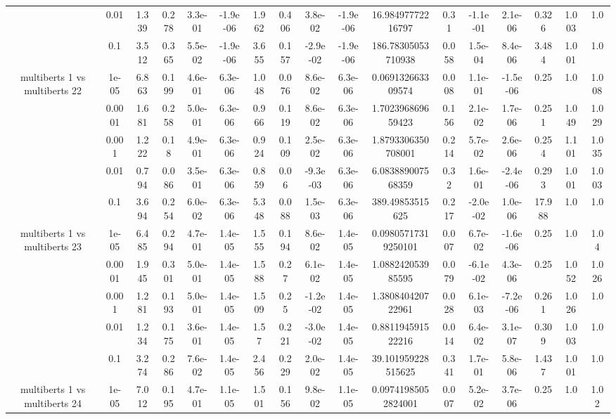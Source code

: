 \begin{tabular}{|c|c|c|c|c|c|c|c|c|c|c|c|c|c|c|c|c|}
 & 0.01 & 1.339 & 0.278 & 3.3e-01 & -1.9e-06 & 1.962 & 0.406 & 3.8e-02 & -1.9e-06 & 16.98497772216797 & 0.31 & -1.1e-01 & 2.1e-06 & 0.326 & 1.003 & 1.0 \\
 & 0.1 & 3.512 & 0.365 & 5.5e-02 & -1.9e-06 & 3.655 & 0.157 & -2.9e-02 & -1.9e-06 & 186.78305053710938 & 0.058 & 1.5e-04 & 8.4e-06 & 3.484 & 1.001 & 1.0 \\
\hline
\multirow{5}{*}{multiberts 1 vs multiberts 22} & 1e-05 & 6.863 & 0.199 & 4.6e-01 & 6.3e-06 & 1.048 & 0.076 & 8.6e-02 & 6.3e-06 & 0.069132663309574 & 0.008 & 1.1e-01 & -1.5e-06 & 0.25 & 1.0 & 1.008 \\
 & 0.0001 & 1.681 & 0.258 & 5.0e-01 & 6.3e-06 & 0.966 & 0.119 & 8.6e-02 & 6.3e-06 & 1.702396869659423 & 0.156 & 2.1e-02 & 1.7e-06 & 0.251 & 1.049 & 1.029 \\
 & 0.001 & 1.222 & 0.18 & 4.9e-01 & 6.3e-06 & 0.924 & 0.109 & 2.5e-02 & 6.3e-06 & 1.8793306350708001 & 0.214 & 5.7e-02 & 2.6e-06 & 0.254 & 1.101 & 1.035 \\
 & 0.01 & 0.794 & 0.086 & 3.5e-01 & 6.3e-06 & 0.859 & 0.06 & -9.3e-03 & 6.3e-06 & 6.083889007568359 & 0.32 & 1.6e-01 & -2.4e-06 & 0.293 & 1.001 & 1.003 \\
 & 0.1 & 3.694 & 0.254 & 6.0e-02 & 6.3e-06 & 5.348 & 0.088 & 1.5e-03 & 6.3e-06 & 389.49853515625 & 0.217 & -2.0e-02 & 1.0e-06 & 17.988 & 1.0 & 1.0 \\
\hline
\multirow{5}{*}{multiberts 1 vs multiberts 23} & 1e-05 & 6.485 & 0.294 & 4.7e-01 & 1.4e-05 & 1.555 & 0.194 & 8.6e-02 & 1.4e-05 & 0.09805717319250101 & 0.007 & 6.7e-02 & -1.6e-06 & 0.25 & 1.0 & 1.04 \\
 & 0.0001 & 1.945 & 0.301 & 5.0e-01 & 1.4e-05 & 1.588 & 0.27 & 6.1e-02 & 1.4e-05 & 1.088242053985595 & 0.079 & -6.1e-02 & 4.3e-06 & 0.25 & 1.052 & 1.026 \\
 & 0.001 & 1.281 & 0.193 & 5.0e-01 & 1.4e-05 & 1.509 & 0.25 & -1.2e-02 & 1.4e-05 & 1.380840420722961 & 0.028 & 6.1e-03 & -7.2e-06 & 0.261 & 1.026 & 1.0 \\
 & 0.01 & 1.234 & 0.175 & 3.6e-01 & 1.4e-05 & 1.57 & 0.221 & -3.0e-02 & 1.4e-05 & 0.881194591522216 & 0.014 & 6.4e-02 & 3.1e-07 & 0.309 & 1.003 & 1.0 \\
 & 0.1 & 3.274 & 0.286 & 7.6e-02 & 1.4e-05 & 2.456 & 0.229 & 2.0e-02 & 1.4e-05 & 39.101959228515625 & 0.341 & 1.7e-01 & 5.8e-06 & 1.437 & 1.001 & 1.0 \\
\hline
\multirow{5}{*}{multiberts 1 vs multiberts 24} & 1e-05 & 7.012 & 0.195 & 4.7e-01 & 1.1e-05 & 1.501 & 0.156 & 9.8e-02 & 1.1e-05 & 0.09741985052824001 & 0.007 & 5.2e-02 & 3.7e-06 & 0.25 & 1.0 & 1.02 \\

\end{tabular}
